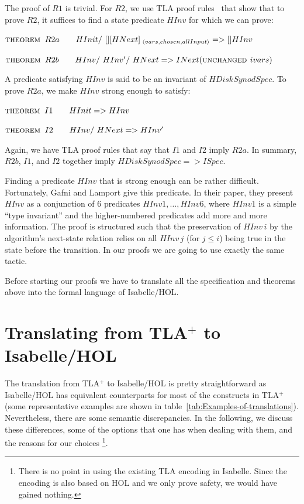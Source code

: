 The proof of $R1$ is trivial. For $R2$, we use TLA proof
rules~\cite{LamportTLA:2002} that show that to prove $R2$, it
suffices to find a state predicate $HInv$ for which we can prove:

\medskip{} 

$\mbox{\sc theorem }\, R2a\qquad HInit /\ [] [HNext]_{\;\langle
  vars,chosen,allInput\rangle} => [] HInv$

$\THEOREM\, R2b\qquad HInv /\ HInv' /\ HNext =>
INext \/ (\UNCHANGED ivars)$ 

\medskip

A predicate satisfying $HInv$ is said to be an invariant of
$HDiskSynodSpec$.  To prove $R2a$, we make $HInv$ strong enough to
satisfy:

\medskip

 $\mbox{\sc theorem }\, I1\qquad HInit => HInv$

$\mbox{\sc theorem }\, I2\qquad HInv /\ HNext => HInv'$
\medskip

Again, we have TLA proof rules that say that $I1$ and $I2$ imply
$R2a$. In summary, $R2b$, $I1$, and $I2$ together imply
$HDiskSynodSpec => ISpec$.

Finding a predicate $HInv$ that is strong enough can be rather
difficult.  Fortunately, Gafni and Lamport give this predicate. In
their paper, they present $HInv$ as a conjunction of 6 predicates
$HInv1,\ldots,HInv6$, where $HInv1$ is a simple {}``type invariant''
and the higher-numbered predicates add more and more information. The
proof is structured such that the preservation of $HInv\, i$ by the
algorithm's next-state relation relies on all $HInv\, j$ (for $j\leq
i$) being true in the state before the transition. In our proofs we
are going to use exactly the same tactic.

Before starting our proofs we have to translate all the specification
and theorems above into the formal language of Isabelle/HOL.

\notla

\section{Translating from TLA$^{+}$ to
  Isabelle/HOL\label{sec:Translating-from-TLA}}

The translation from TLA$^{+}$ to Isabelle/HOL is pretty
straightforward as Isabelle/HOL has equivalent counterparts for most
of the constructs in TLA$^{+}$ (some representative examples are shown
in table~\ref{tab:Examples-of-translations}).  Nevertheless, there are
some semantic discrepancies. In the following, we discuss these
differences, some of the options that one has when dealing with them,
and the reasons for our choices%
\footnote{There is no point in using the existing TLA encoding in
  Isabelle.  Since the encoding is also based on HOL and we only prove
  safety, we would have gained nothing.%
}.



